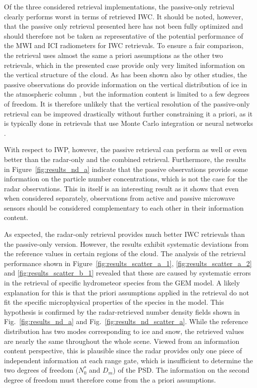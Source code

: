 \documentclass[journal abbreviation, manuscript]{copernicus}
\begin{document}
Of the three considered retrieval implementations, the passive-only retrieval
clearly performs worst in terms of retrieved IWC. It should be noted, however,
that the passive only retrieval presented here has not been fully optimized and
should therefore not be taken as representative of the potential performance of
the MWI and ICI radiometers for IWC retrievals. To ensure a fair comparison, the
retrieval uses almost the same a priori assumptions as the other two retrievals,
which in the presented case provide only very limited information on the
vertical structure of the cloud. As has been shown also by other studies, the
passive observations do provide information on the vertical distribution of ice
in the atmospheric column \citep{wang17, grutzun18}, but the information content
is limited to a few degrees of freedom. It is therefore unlikely that the
vertical resolution of the passive-only retrieval can be improved drastically
without further constraining it a priori, as it is typically done in retrievals
that use Monte Carlo integration or neural networks \citep{pfreundschuh18}.

With respect to IWP, however, the passive retrieval can perform as well or even
better than the radar-only and the combined retrieval. Furthermore, the results
in Figure~\ref{fig:results_nd_a} indicate that the passive observations provide
some information on the particle number concentrations, which is not the case
for the radar observations. This in itself is an interesting result as it shows
that even when considered separately, observations from active and passive
microwave sensors should be considered complementary to each other in their
information content.

As expected, the radar-only retrieval provides much better IWC retrievals than
the passive-only version. However, the results exhibit systematic deviations
from the reference values in certain regions of the cloud. The analysis of the
retrieval performance shown in Figure~\ref{fig:results_scatter_a_1},
\ref{fig:results_scatter_a_2} and \ref{fig:results_scatter_b_1} revealed that
these are caused by systematic errors in the retrieval of specific hydrometeor
species from the GEM model. A likely explanation for this is that the priori
assumptions applied in the retrieval do not fit the specific microphysical
properties of the species in the model. This hypothesis is confirmed by the
radar-retrieved number density fields shown in Fig.~\ref{fig:results_nd_a} and
Fig.~\ref{fig:results_nd_scatter_a}. While the reference distribution has two
modes corresponding to ice and snow, the retrieved values are nearly the same
throughout the whole scene. Viewed from an information content perspective, this
is plausible since the radar provides only one piece of independent information
at each range gate, which is insufficient to determine the two degrees of
freedom ($N_0^*$ and $D_m$) of the PSD. The information on the second degree of
freedom must therefore come from the a priori assumptions.
\end{document}

